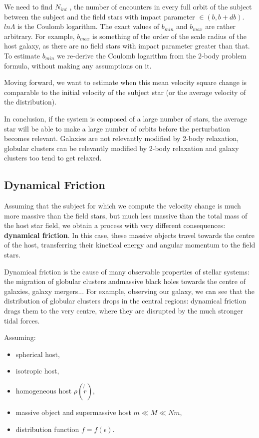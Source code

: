 \documentclass[a4paper,12pt]{article}
\begin{document}
We need to find $N_{int}$ , the number of encounters in every full orbit of the subject between the subject and the field stars with impact parameter $ \in (b, b + db)$. $ln\Lambda$ is the Coulomb logarithm. The exact values of $b_{min}$ and $b_{max}$ are rather arbitrary. For example, $b_{max}$ is something of the order of the scale radius of the host galaxy, as there are no field stars with impact parameter greater than that. To estimate $b_{min}$ we re-derive the Coulomb logarithm from the 2-body problem formula, without making any
assumptions on it.

Moving forward, we want to estimate when this mean velocity square change is comparable to the initial velocity of the subject star (or the average velocity of the distribution). 

In conclusion, if the system is composed of a large number of stars, the average star will be able to make a large number of orbits before the perturbation becomes relevant.
Galaxies are not relevantly modified by 2-body relaxation, globular clusters can be relevantly modified by 2-body relaxation and galaxy clusters too tend to get relaxed.



\subsection{Dynamical Friction}

Assuming that the subject for which we compute the velocity change is much more massive than the field stars, but much less massive than the total mass of the host star field, we obtain a process with very different consequences: \textbf{dynamical friction}. In this case, these massive objects travel towards the centre of the host, transferring their kinetical energy and angular momentum to the field stars.

Dynamical friction is the cause of many observable properties of stellar systems: the migration of globular clusters andmassive black holes towards the centre of galaxies, galaxy mergers... For example, observing our galaxy, we can see that the distribution of globular clusters drops in the central regions: dynamical friction drags them to the very centre, where they are disrupted by the much stronger tidal forces.

Assuming: 

\begin{itemize}
	\item spherical host,
	\item isotropic host,
	\item homogeneous host $\rho(\not{r})$,
	\item massive object and supermassive host $m \ll M \ll Nm$,
	\item distribution function $f=f(\epsilon)$.
\end{itemize}
\end{document}

